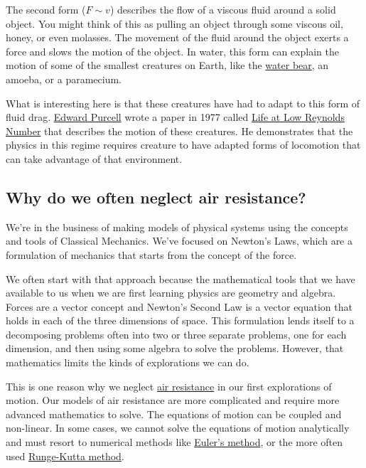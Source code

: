 \documentclass[11pt]{article}
\begin{document}
The second form (\(F \sim v\)) describes the flow of a viscous fluid
around a solid object. You might think of this as pulling an object
through some viscous oil, honey, or even molasses. The movement of the
fluid around the object exerts a force and slows the motion of the
object. In water, this form can explain the motion of some of the
smallest creatures on Earth, like the
\href{https://en.wikipedia.org/wiki/Tardigrade}{water bear}, an amoeba,
or a paramecium.

What is interesting here is that these creatures have had to adapt to
this form of fluid drag.
\href{https://en.wikipedia.org/wiki/Edward_M._Purcell}{Edward Purcell}
wrote a paper in 1977 called
\href{../../docs/papers/purcell_AJP_1977.pdf}{Life at Low Reynolds
Number} that describes the motion of these creatures. He demonstrates
that the physics in this regime requires creature to have adapted forms
of locomotion that can take advantage of that environment.

\subsection{Why do we often neglect air
resistance?}\label{why-do-we-often-neglect-air-resistance}

We're in the business of making models of physical systems using the
concepts and tools of Classical Mechanics. We've focused on Newton's
Laws, which are a formulation of mechanics that starts from the concept
of the force.

We often start with that approach because the mathematical tools that we
have available to us when we are first learning physics are geometry and
algebra. Forces are a vector concept and Newton's Second Law is a vector
equation that holds in each of the three dimensions of space. This
formulation lends itself to a decomposing problems often into two or
three separate problems, one for each dimension, and then using some
algebra to solve the problems. However, that mathematics limits the
kinds of explorations we can do.

This is one reason why we neglect
\href{https://en.wikipedia.org/wiki/Air_resistance}{air resistance} in
our first explorations of motion. Our models of air resistance are more
complicated and require more advanced mathematics to solve. The
equations of motion can be coupled and non-linear. In some cases, we
cannot solve the equations of motion analytically and must resort to
numerical methods like
\href{https://en.wikipedia.org/wiki/Euler_method}{Euler's method}, or
the more often used
\href{https://en.wikipedia.org/wiki/Runge\%E2\%80\%93Kutta_methods}{Runge-Kutta
method}.
\end{document}
